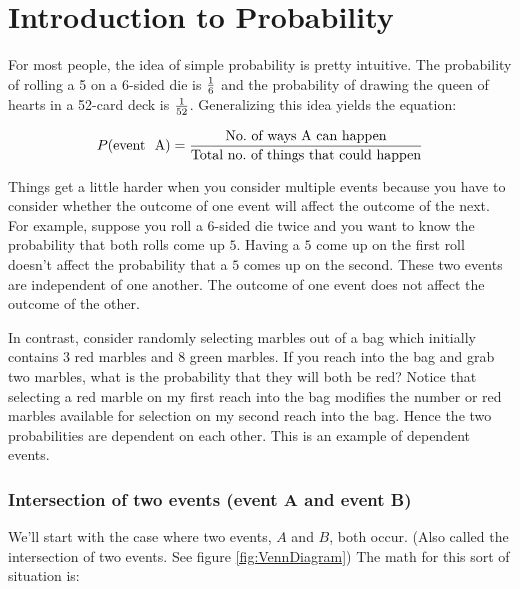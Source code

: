 \chapter{Introduction to Probability}
 \label{chap:probability} 

For most people, the idea of simple probability is pretty intuitive.
The probability of rolling a 5 on a 6-sided die is ${ 1\over 6}$ and
the probability of drawing the queen of hearts in a 52-card deck is
${1\over 52}$.  Generalizing this idea yields the equation:

\begin{equation}\label{eq:simpleProb}
  P(\text{event~ A}) = {\text{No.~of~ways~A~can~happen}\over \text{Total~no.~of~things~that~could~happen}}
\end{equation}



Things get a little harder when you consider multiple events because
you have to consider whether the outcome of one event will affect the
outcome of the next.  For example, suppose you roll a $6$-sided
die twice and you want to know the probability that both rolls come up $5$.
Having a $5$ come up on the first roll doesn't affect the probability
that a $5$ comes up on the second.  These two events are independent
of one another.  The outcome of one event does not affect the outcome
of the other.

In contrast, consider randomly selecting marbles out of a bag which initially
contains $3$ red marbles and $8$ green marbles.   If you reach into the
bag and grab two marbles, what is the probability that they will both
be red?  Notice that selecting a red marble on my first reach into the bag
modifies the number or red marbles available for selection on my
second reach into the bag. Hence the two probabilities are dependent
on each other.  This is an example of dependent events.

\subsection*{Intersection of two events (event A \textbf{and} event B)}

We'll start with the case where two events, $A$ and $B$, both
occur. (Also called the intersection of two events. See figure \ref{fig:VennDiagram})
The math for this sort of situation is:

